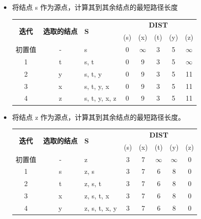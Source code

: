 \documentclass[../../main.tex]{subfiles}
\begin{document}
\begin{solution}
\begin{itemize}
    \item [(1)] 将结点 s 作为源点，计算其到其余结点的最短路径长度
    \begin{table}[ht!]
      \begin{center}
        \begin{tabular}{c|c|l|c c c c c} 
        \multirow{2}{*}{\textbf{迭代}} & \multirow{2}{*}{\textbf{选取的结点}} & \multirow{2}{*}{\textbf{S}} & \multicolumn{5}{c}{\textbf{DIST}} \\
        & & & (s) &(x) & (t) & (y) & (z)\\
        \hline
        初置值 & - &s            & 0 & \(\infty\) & 3 & 5 & \(\infty\) \\
        1      & t &s, t         & 0 & 9          & 3 & 5 & \(\infty\) \\
        2      & y &s, t, y      & 0 & 9          & 3 & 5 & 11         \\
        3      & x &s, t, y, x   & 0 & 9          & 3 & 5 & 11         \\
        4      & z &s, t, y, x, z& 0 & 9          & 3 & 5 & 11         \\
        \end{tabular}
      \end{center}
    \end{table}
    \item [(2)] 将结点 z 作为源点，计算其到其余结点的最短路径长度。
    \begin{table}[h!]
      \begin{center}
        \begin{tabular}{c|c|l|c c c c c} 
        \multirow{2}{*}{\textbf{迭代}} & \multirow{2}{*}{\textbf{选取的结点}} & \multirow{2}{*}{\textbf{S}} & \multicolumn{5}{c}{\textbf{DIST}} \\
        & & & (s) &(x) & (t) & (y) & (z)\\
        \hline
        初置值 & - & z             & 3 & 7 & \(\infty\) & \(\infty\) & 0 \\
        1      & s & z, s          & 3 & 7 &  6         &        8   & 0 \\
        2      & t & z, s, t       & 3 & 7 &  6         &    8       & 0 \\
        3      & x & z, s, t, x    & 3 & 7 &   6        &     8      & 0 \\
        4      & y & z, s, t, x, y & 3 & 7 &    6       &     8      & 0 \\
        \end{tabular}
      \end{center}
    \end{table}
\end{itemize}

\end{solution}
  
\end{document}
